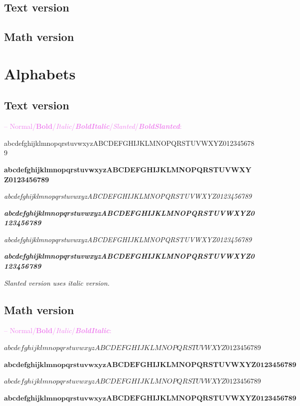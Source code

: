 \documentclass[a4paper]{scrartcl}
\newcommand{\abc}{abcdefghijklmnopqrstuvwxyz}
\newcommand{\ABC}{ABCDEFGHIJKLMNOPQRSTUVWXYZ}
\newcommand{\samplenumbers}{0123456789}
\begin{document}
\subsection{Text version}


\pagebreak

\subsection{Math version}


\pagebreak

\section{Alphabets}

\subsection{Text version}

\textcolor{violet}{-- Normal/\textbf{Bold}/\textit{Italic}/\textit{\textbf{BoldItalic}}/\textsl{Slanted}/\textsl{\textbf{BoldSlanted}}:}

\abc\ABC\samplenumbers

\textbf{\abc\ABC\samplenumbers}

\textit{\abc\ABC\samplenumbers}

\textit{\textbf{\abc\ABC\samplenumbers}}

\textsl{\abc\ABC\samplenumbers}

\textsl{\textbf{\abc\ABC\samplenumbers}}

\smallskip

\textit{Slanted version uses italic version.}

\subsection{Math version}

\textcolor{violet}{-- Normal/\textbf{Bold}/\textit{Italic}/\textit{\textbf{BoldItalic}}:}

$\abc\ABC\samplenumbers$

$\mathbf{\abc\ABC\samplenumbers}$

$\mathit{\abc\ABC\samplenumbers}$

$\mathit{\mathbf{\abc\ABC\samplenumbers}}$
\end{document}
